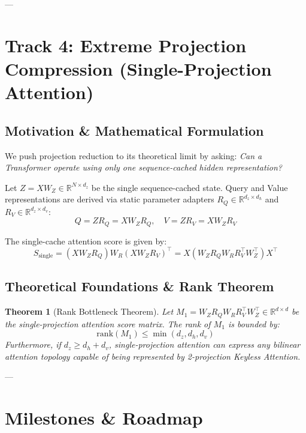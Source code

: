 \documentclass[11pt,a4paper]{article}
\newtheorem{theorem}{Theorem}
\begin{document}
---

\section{Track 4: Extreme Projection Compression (Single-Projection Attention)}

\subsection{Motivation \& Mathematical Formulation}
We push projection reduction to its theoretical limit by asking: \emph{Can a Transformer operate using only one sequence-cached hidden representation?}

Let $Z = X W_Z \in \mathbb{R}^{N \times d_z}$ be the single sequence-cached state. Query and Value representations are derived via static parameter adapters $R_Q \in \mathbb{R}^{d_z \times d_h}$ and $R_V \in \mathbb{R}^{d_z \times d_v}$:
\begin{equation}
Q = Z R_Q = X W_Z R_Q, \quad V = Z R_V = X W_Z R_V
\end{equation}

The single-cache attention score is given by:
\begin{equation}
S_{\text{single}} = (X W_Z R_Q) W_R (X W_Z R_V)^\top = X \left( W_Z R_Q W_R R_V^\top W_Z^\top \right) X^\top
\end{equation}

\subsection{Theoretical Foundations \& Rank Theorem}
\begin{theorem}[Rank Bottleneck Theorem]
Let $M_1 = W_Z R_Q W_R R_V^\top W_Z^\top \in \mathbb{R}^{d \times d}$ be the single-projection attention score matrix. The rank of $M_1$ is bounded by:
\begin{equation}
\text{rank}(M_1) \le \min(d_z, d_h, d_v)
\end{equation}
Furthermore, if $d_z \ge d_h + d_v$, single-projection attention can express any bilinear attention topology capable of being represented by 2-projection Keyless Attention.
\end{theorem}

---

\section{Milestones \& Roadmap}
\end{document}
